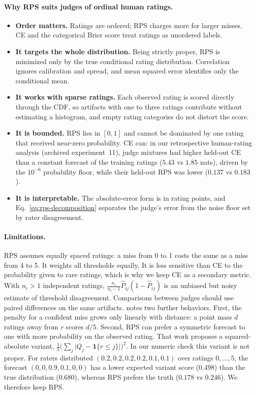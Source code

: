 \paragraph{Why RPS suits judges of ordinal human ratings.}
\begin{itemize}
\item \textbf{Order matters.} Ratings are ordered; RPS charges more for larger misses.
CE and the categorical Brier score treat ratings as unordered labels.
\item \textbf{It targets the whole distribution.} Being strictly proper, RPS is minimized only by the true conditional rating distribution.
Correlation ignores calibration and spread, and mean squared error identifies only the conditional mean.
\item \textbf{It works with sparse ratings.} Each observed rating is scored directly through the CDF, so artifacts with one to three ratings contribute without estimating a histogram, and empty rating categories do not distort the score.
\item \textbf{It is bounded.} RPS lies in $[0,1]$ and cannot be dominated by one rating that received near-zero probability.
CE can: in our retrospective human-rating analysis (archived experiment~11), judge mixtures had higher held-out CE than a constant forecast of the training ratings ($5.43$ vs $1.85$ nats), driven by the $10^{-6}$ probability floor, while their held-out RPS was lower ($0.137$ vs $0.183$).
\item \textbf{It is interpretable.} The absolute-error form is in rating points, and Eq.~\ref{eq:rps-decomposition} separates the judge's error from the noise floor set by rater disagreement.
\end{itemize}

\paragraph{Limitations.}
RPS assumes equally spaced ratings: a miss from 0 to 1 costs the same as a miss from 4 to 5.
It weights all thresholds equally.
It is less sensitive than CE to the probability given to rare ratings, which is why we keep CE as a secondary metric.
With $n_i>1$ independent ratings, $\frac{n_i}{n_i-1}\hat P_{ij}(1-\hat P_{ij})$ is an unbiased but noisy estimate of threshold disagreement.
Comparisons between judges should use paired differences on the same artifacts.
\citet{galdran2023performance} notes two further behaviors.
First, the penalty for a confident miss grows only linearly with distance: a point mass $d$ ratings away from $r$ scores $d/5$.
Second, RPS can prefer a symmetric forecast to one with more probability on the observed rating.
That work proposes a squared-absolute variant, $\frac{1}{5}\bigl(\sum_j\lvert Q_j-\mathbf{1}\{r\le j\}\rvert\bigr)^2$.
In our numeric check this variant is not proper.
For raters distributed $(0.2,0.2,0.2,0.2,0.1,0.1)$ over ratings $0,\dots,5$, the forecast $(0,0,0.9,0.1,0,0)$ has a lower expected variant score ($0.498$) than the true distribution ($0.680$), whereas RPS prefers the truth ($0.178$ vs $0.246$).
We therefore keep RPS.

